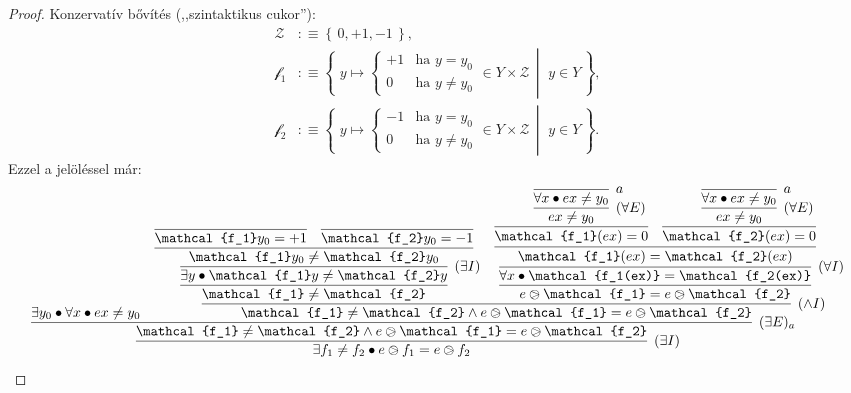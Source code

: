 \documentclass{article}
\newcommand{\obSet}{\ob_{\setCat}}
\newcommand{\ob}{\mathsf{Ob}}
\newcommand{\setCat}{\mathbf{Set}}
\newcommand{\parenth}[1]{\left(#1\right)}
\newcommand{\setOf}[1]{\left\lbrace\,#1\,\right\rbrace}
\newcommand{\setAbs}[2]{\left\lbrace\,\,#1\,\middle|\,\,#2\,\right\rbrace}
\begin{document}
	\begin{proof}
		Konzervatív bővítés (,,szintaktikus cukor''):
		\begin{align}
			\mathcal Z    &:\equiv \setOf{0, +1, -1},\\
			\mathcal{f_1} &:\equiv \setAbs{y \mapsto \begin{cases}+1&\text{ha }y=y_0\\0&\text{ha } y\neq y_0\end{cases}\in Y\times\mathcal Z}{y\in Y},\\
			\mathcal{f_2} &:\equiv \setAbs{y \mapsto \begin{cases}-1&\text{ha }y=y_0\\0&\text{ha } y\neq y_0\end{cases}\in Y\times\mathcal Z}{y\in Y}.
		\end{align}
		Ezzel a jelöléssel már:
		\[
			\infer[\parenth{\exists I}]{
				\exists f_1 \neq f_2 \bullet e\ogreaterthan f_1 = e\ogreaterthan f_2
			}
			{
				\infer[(\exists E)_a]{
					\mathcal{f_1} \neq \mathcal{f_2} \land e\ogreaterthan \mathcal{f_1} = e\ogreaterthan \mathcal{f_2}
				}{
					\exists y_0 \bullet \forall x \bullet ex \neq y_0
					&
					\infer[(\land I)]{
						\mathcal{f_1} \neq \mathcal{f_2} \land e\ogreaterthan \mathcal{f_1} = e\ogreaterthan \mathcal{f_2}
					}{
						\infer{
							\mathcal{f_1} \neq \mathcal{f_2}
						}{
							\infer[(\exists I)]{
								\exists y \bullet \mathcal{f_1}y \neq \mathcal{f_2}y
							}{
								\infer{
									\mathcal{f_1}y_0 \neq \mathcal{f_2}y_0
								}{
									\infer{\mathcal{f_1}y_0 = +1}{}
									&
									\infer{\mathcal{f_2}y_0 = -1}{}
								}
							}
						}
						&
						\infer{
							e\ogreaterthan \mathcal{f_1} = e\ogreaterthan \mathcal{f_2}
						}{
							\infer[(\forall I)]{
								\forall x \bullet \mathcal{f_1(ex)} = \mathcal{f_2(ex)}
							}{
								\infer{
									\mathcal{f_1}(ex) = \mathcal{f_2}(ex)
								}{
									\infer{
										\mathcal{f_1}(ex) = 0
									}{
										\infer[(\forall E)]{
											ex \neq y_0
										}{
											\infer[a]{
												\forall x \bullet ex \neq y_0
											}{}
										}
									}
									&
									\infer{
										\mathcal{f_2}(ex) = 0
									}{
										\infer[(\forall E)]{
											ex \neq y_0
										}{
											\infer[a]{
												\forall x \bullet ex \neq y_0
											}{}
										}
									}
								}
							}
						}
					}
				}
			}
		\]%
	\end{proof}
	\begin{comment}
		\infer[\parenth{\forall I}]{
			\forall x \in X \bullet \mathcal{f_1}\parenth{ex} = \mathcal{f_2}\parenth{ex}
		}{
			\infer[\parenth{\to I}_a]{
				x \in X \to \mathcal{f_1}\parenth{ex} = \mathcal{f_2}\parenth{ex}
			}{
				\infer{
					\mathcal{f_1}\parenth{ex} = \mathcal{f_2}\parenth{ex}
				}{
					\infer[a]{x \in X}{}
				}
			}
		}
	\end{comment}
\end{document}
